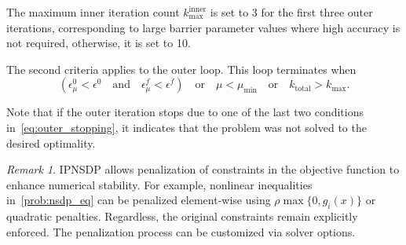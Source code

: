 \documentclass[]{interact}
\theoremstyle{plain}%
\theoremstyle{definition}
\theoremstyle{remark}
\newtheorem{remark}{Remark}
\begin{document}
The maximum inner iteration count \(k_{\max}^{\mathrm{inner}}\) is set to 3 for the first three outer iterations, corresponding to large barrier parameter values where high accuracy is not required, otherwise, it is set to 10.

The second criteria applies to the outer loop. This loop terminates when
\begin{equation} \label{eq:outer_stopping}
\left( \epsilon_\mu^0 < \epsilon^0 \quad \text{and} \quad \epsilon_\mu^f < \epsilon^f \right) \quad \text{or} \quad \mu < \mu_{\min} \quad \text{or} \quad k_{\mathrm{total}} > k_{\max}.
\end{equation}


Note that if the outer iteration stops due to one of the last two conditions in~\eqref{eq:outer_stopping}, it indicates that the problem was not solved to the desired optimality.

\begin{remark}\label{rem:penality}
    IPNSDP allows penalization of constraints in the objective function to enhance numerical stability. For example, nonlinear inequalities in~\eqref{prob:nsdp_eq} can be penalized element-wise using $\rho \max\{0, g_i(x)\}$ or quadratic penalties. Regardless, the original constraints remain explicitly enforced. The penalization process can be customized via solver options.
\end{remark}
\end{document}
